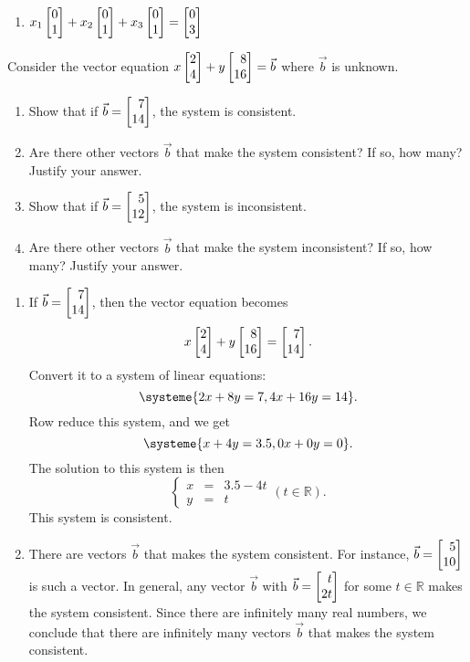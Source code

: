 \begin{exercises}
\begin{problist}
\begin{solution}
\begin{enumerate}
				\item $x_{1}\mat{0 \\ 1}+x_{2}\mat{0 \\ 1}+x_{3}\mat{0 \\ 1}=\mat
					{0 \\ 3}$
			\end{enumerate}
		\end{solution}

		\prob Consider the vector equation $x\mat{2 \\ 4}+y\mat{8 \\ 16}=\vec b$
		where $\vec b$ is unknown.
		\begin{enumerate}
			\item Show that if $\vec b=\mat{7 \\ 14}$, the system is consistent.

			\item Are there other vectors $\vec b$ that make the system consistent?
				If so, how many? Justify your answer.

			\item Show that if $\vec b=\mat{5 \\ 12}$, the system is
				inconsistent.

			\item Are there other vectors $\vec b$ that make the system inconsistent?
				If so, how many? Justify your answer.
		\end{enumerate}

		\begin{solution}
			\begin{enumerate}
				\item If $\vec b=\mat{7 \\ 14}$, then the vector equation
					becomes
					\[
						x\mat{2 \\ 4}+y\mat{8 \\ 16}=\mat{7 \\ 14}.
					\]
					Convert it to a system of linear equations:
					\[
						\systeme{2x+8y=7,4x+16y=14}.
					\]
					Row reduce this system, and we get
					\[
						\systeme{x+4y=3.5, 0x+0y=0}.
					\]
					The solution to this system is then
					\[
						\left\{
						\begin{array}
							{ccc} x & = & 3.5-4t \\ y & = & t
						\end{array}\right. (t\in \mathbb{R}).
					\]
					This system is consistent.

				\item There are vectors $\vec{b}$ that makes the system consistent.
					For instance, $\vec b=\mat{5 \\ 10}$ is such a vector. In
					general, any vector $\vec b$ with $\vec b=\mat{t \\ 2t}$ for
					some $t\in\mathbb{R}$ makes the system consistent. Since
					there are infinitely many real numbers, we conclude that there
					are infinitely many vectors $\vec b$ that makes the system consistent.


\end{enumerate}
\end{solution}
\end{problist}
\end{exercises}
